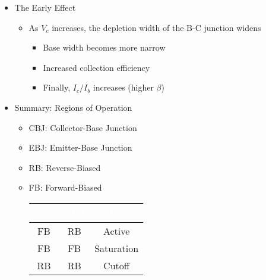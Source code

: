 \begin{itemize}
\begin{itemize}
\begin{itemize}
        \end{itemize}

    \end{itemize}

  \item The Early Effect

    \begin{itemize}

      \item As $V_c$ increases, the depletion width of the B-C junction widens

        \begin{itemize}

          \item Base width becomes more narrow

          \item Increased collection efficiency

          \item Finally, $I_c/I_b$ increases (higher $\beta$)

        \end{itemize}

    \end{itemize}

  \item Summary: Regions of Operation

    \begin{itemize}

      \item CBJ: Collector-Base Junction

      \item EBJ: Emitter-Base Junction

      \item RB: Reverse-Biased

      \item FB: Forward-Biased

        \begin{center}
          \begin{tabular}[H]{|c|c|c|}
            \hline
            \rowcolor{black} \textcolor{white}{EBJ} & \textcolor{white}{CBJ} & \textcolor{white}{Mode}\\
            \hline
            \rowcolor{black!5} FB & RB & Active\\
            \hline
            \rowcolor{black!30} FB & FB & Saturation\\
            \hline
            \rowcolor{black!5} RB & RB & Cutoff\\
            \hline
          \end{tabular}
        \end{center}


\end{itemize}
\end{itemize}
